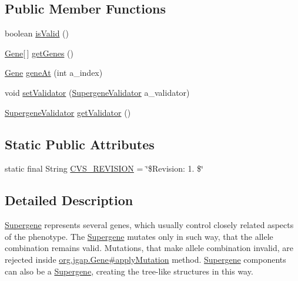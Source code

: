 \subsection*{Public Member Functions}
\begin{DoxyCompactItemize}
\item 
boolean \hyperlink{interfaceorg_1_1jgap_1_1supergenes_1_1_supergene_a9a664a40144dca4dd6fd3b4170ce7570}{is\-Valid} ()
\item 
\hyperlink{interfaceorg_1_1jgap_1_1_gene}{Gene}\mbox{[}$\,$\mbox{]} \hyperlink{interfaceorg_1_1jgap_1_1supergenes_1_1_supergene_a34ec660dc0d241a9eabc993ddef2ca87}{get\-Genes} ()
\item 
\hyperlink{interfaceorg_1_1jgap_1_1_gene}{Gene} \hyperlink{interfaceorg_1_1jgap_1_1supergenes_1_1_supergene_a62e038f5ed00578a997a044f49136bbd}{gene\-At} (int a\-\_\-index)
\item 
void \hyperlink{interfaceorg_1_1jgap_1_1supergenes_1_1_supergene_a56ef316d0073f74cfd2704ac407ad83f}{set\-Validator} (\hyperlink{interfaceorg_1_1jgap_1_1supergenes_1_1_supergene_validator}{Supergene\-Validator} a\-\_\-validator)
\item 
\hyperlink{interfaceorg_1_1jgap_1_1supergenes_1_1_supergene_validator}{Supergene\-Validator} \hyperlink{interfaceorg_1_1jgap_1_1supergenes_1_1_supergene_a97719a430d58fba89ba26ed8f4a2a490}{get\-Validator} ()
\end{DoxyCompactItemize}
\subsection*{Static Public Attributes}
\begin{DoxyCompactItemize}
\item 
static final String \hyperlink{interfaceorg_1_1jgap_1_1supergenes_1_1_supergene_a2af8daabd0a582a9d761a3437c69be66}{C\-V\-S\-\_\-\-R\-E\-V\-I\-S\-I\-O\-N} = \char`\"{}\$Revision\-: 1. \$\char`\"{}
\end{DoxyCompactItemize}


\subsection{Detailed Description}
\hyperlink{interfaceorg_1_1jgap_1_1supergenes_1_1_supergene}{Supergene} represents several genes, which usually control closely related aspects of the phenotype. The \hyperlink{interfaceorg_1_1jgap_1_1supergenes_1_1_supergene}{Supergene} mutates only in such way, that the allele combination remains valid. Mutations, that make allele combination invalid, are rejected inside \hyperlink{interfaceorg_1_1jgap_1_1_gene_af506b6e1d6ceb3e88e522da4c79adba4}{org.\-jgap.\-Gene\#apply\-Mutation} method. \hyperlink{interfaceorg_1_1jgap_1_1supergenes_1_1_supergene}{Supergene} components can also be a \hyperlink{interfaceorg_1_1jgap_1_1supergenes_1_1_supergene}{Supergene}, creating the tree-\/like structures in this way. 


